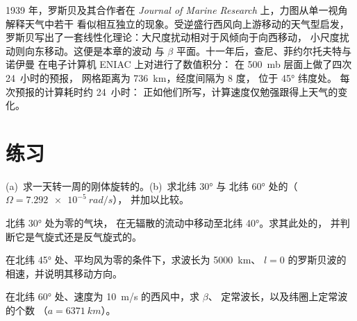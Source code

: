 \begin{history}[从长波到首次数值预报]
1939 年，罗斯贝及其合作者在 \emph{Journal of Marine
Research} 上，力图从单一视角解释天气中若干
看似相互独立的现象。受逆盛行西风向上游移动的天气型启发，
罗斯贝写出了一套线性化理论：大尺度扰动相对于风倾向于向西移动，
小尺度扰动则向东移动。这便是本章的波动
与 $\beta$ 平面。十一年后，查尼、菲约尔托夫特与诺伊曼
在电子计算机 ENIAC 上对进行了数值积分：
在 \qty{500}{mb} 层面上做了四次 24~小时的预报，
网格距离为 \qty{736}{km}，经度间隔为 8 度，
位于 \ang{45} 纬度处。
每次预报的计算耗时约 24~小时：
正如他们所写，计算速度仅勉强跟得上天气的变化。
\end{history}

\section{练习}

\begin{exercise}[$\star$]\label{exo:b3:atmospheric-dynamics:1}
(a)~求一天转一周的刚体旋转的。(b)~求北纬 \ang{30} 与
北纬 \ang{60} 处的（$\Omega = \qty{7.292e-5}{rad/s}$），
并加以比较。
\end{exercise}

\begin{exercise}[$\star$]\label{exo:b3:atmospheric-dynamics:2}
北纬 \ang{30} 处为零的气块，
在无辐散的流动中移动至北纬 \ang{40}。求其此处的，
并判断它是气旋式还是反气旋式的。
\end{exercise}

\begin{exercise}[$\star$]\label{exo:b3:atmospheric-dynamics:3}
在北纬 \ang{45} 处、平均风为零的条件下，求波长为 \qty{5000}{km}、
$l = 0$ 的罗斯贝波的相速，并说明其移动方向。
\end{exercise}

\begin{exercise}[$\star$]\label{exo:b3:atmospheric-dynamics:4}
在北纬 \ang{60} 处、速度为 \qty{10}{m/s} 的西风中，求 $\beta$、
定常波长，以及纬圈上定常波的个数
（$a = \qty{6371}{km}$）。
\end{exercise}

